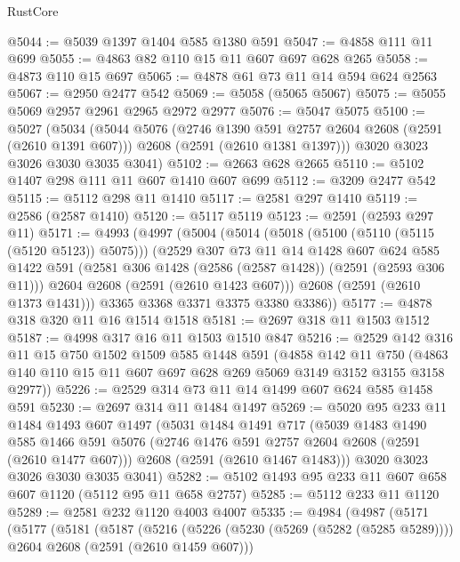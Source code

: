 \begin{lexlean}{RustCore}
\begin{coremodule}
@5044 := @5039 @1397 @1404 @585 @1380 @591
@5047 := @4858 @111 @11 @699
@5055 := @4863 @82 @110 @15 @11 @607 @697 @628 @265
@5058 := @4873 @110 @15 @697
@5065 := @4878 @61 @73 @11 @14 @594 @624 @2563
@5067 := @2950 @2477 @542
@5069 := @5058 (@5065 @5067)
@5075 := @5055 @5069 @2957 @2961 @2965 @2972 @2977
@5076 := @5047 @5075
@5100 := @5027
    (@5034
      (@5044
        @5076
        (@2746 @1390 @591 @2757 @2604 @2608 (@2591 (@2610 @1391 @607)))
        @2608
        (@2591 (@2610 @1381 @1397)))
      @3020
      @3023
      @3026
      @3030
      @3035
      @3041)
@5102 := @2663 @628 @2665
@5110 := @5102 @1407 @298 @111 @11 @607 @1410 @607 @699
@5112 := @3209 @2477 @542
@5115 := @5112 @298 @11 @1410
@5117 := @2581 @297 @1410
@5119 := @2586 (@2587 @1410)
@5120 := @5117 @5119
@5123 := @2591 (@2593 @297 @11)
@5171 := @4993
    (@4997
      (@5004
        (@5014
          (@5018 (@5100 (@5110 (@5115 (@5120 @5123)) @5075)))
          (@2529
            @307
            @73
            @11
            @14
            @1428
            @607
            @624
            @585
            @1422
            @591
            (@2581 @306 @1428 (@2586 (@2587 @1428)) (@2591 (@2593 @306 @11)))
            @2604
            @2608
            (@2591 (@2610 @1423 @607)))
          @2608
          (@2591 (@2610 @1373 @1431)))
        @3365
        @3368
        @3371
        @3375
        @3380
        @3386))
@5177 := @4878 @318 @320 @11 @16 @1514 @1518
@5181 := @2697 @318 @11 @1503 @1512
@5187 := @4998 @317 @16 @11 @1503 @1510 @847
@5216 := @2529
    @142
    @316
    @11
    @15
    @750
    @1502
    @1509
    @585
    @1448
    @591
    (@4858
      @142
      @11
      @750
      (@4863 @140 @110 @15 @11 @607 @697 @628 @269 @5069 @3149 @3152 @3155 @3158 @2977))
@5226 := @2529 @314 @73 @11 @14 @1499 @607 @624 @585 @1458 @591
@5230 := @2697 @314 @11 @1484 @1497
@5269 := @5020
    @95
    @233
    @11
    @1484
    @1493
    @607
    @1497
    (@5031
      @1484
      @1491
      @717
      (@5039
        @1483
        @1490
        @585
        @1466
        @591
        @5076
        (@2746 @1476 @591 @2757 @2604 @2608 (@2591 (@2610 @1477 @607)))
        @2608
        (@2591 (@2610 @1467 @1483)))
      @3020
      @3023
      @3026
      @3030
      @3035
      @3041)
@5282 := @5102 @1493 @95 @233 @11 @607 @658 @607 @1120 (@5112 @95 @11 @658 @2757)
@5285 := @5112 @233 @11 @1120
@5289 := @2581 @232 @1120 @4003 @4007
@5335 := @4984
    (@4987
      (@5171
        (@5177
          (@5181
            (@5187
              (@5216
                (@5226 (@5230 (@5269 (@5282 (@5285 @5289)))) @2604 @2608 (@2591 (@2610 @1459 @607)))

\end{coremodule}
\end{lexlean}
